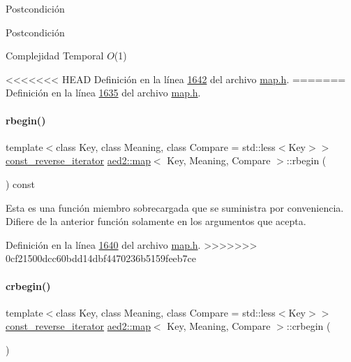 \begin{DoxyPostcond}{\-Postcondición}
\begin{DoxyPostcond}{\-Postcondición}
\begin{DoxyDescription}
\item[Complejidad Temporal]$O$(1)
\end{DoxyDescription}

<<<<<<< HEAD
\-Definición en la línea \hyperlink{map_8h_source_l01642}{1642} del archivo \hyperlink{map_8h_source}{map.\-h}.
=======
Definición en la línea \hyperlink{map_8h_source_l01635}{1635} del archivo \hyperlink{map_8h_source}{map.\+h}.

\mbox{\label{classaed2_1_1map_a71ab53ab04f5e35a189c6576fddeb483_a71ab53ab04f5e35a189c6576fddeb483}} 
\paragraph{\texorpdfstring{rbegin()}{rbegin()}\hspace{0.1cm}{\footnotesize\ttfamily [2/2]}}
{\footnotesize\ttfamily template$<$class Key, class Meaning, class Compare = std\+::less$<$\+Key$>$$>$ \\
\hyperlink{classaed2_1_1map_aed66a216549d13078a3ea6978ea0b768_aed66a216549d13078a3ea6978ea0b768}{const\+\_\+reverse\+\_\+iterator} \hyperlink{classaed2_1_1map}{aed2\+::map}$<$ Key, Meaning, Compare $>$\+::rbegin (\begin{DoxyParamCaption}{ }\end{DoxyParamCaption}) const\hspace{0.3cm}{\ttfamily [inline]}}

Esta es una función miembro sobrecargada que se suministra por conveniencia. Difiere de la anterior función solamente en los argumentos que acepta. 

Definición en la línea \hyperlink{map_8h_source_l01640}{1640} del archivo \hyperlink{map_8h_source}{map.\+h}.
>>>>>>> 0cf21500dcc60bdd14dbf4470236b5159feeb7ce

\mbox{\label{classaed2_1_1map_a6ad62765a2b2e00247b9e35a7542b448_a6ad62765a2b2e00247b9e35a7542b448}} 
\paragraph{\texorpdfstring{crbegin()}{crbegin()}}
{\footnotesize\ttfamily template$<$class Key, class Meaning, class Compare = std\+::less$<$\+Key$>$$>$ \\
\hyperlink{classaed2_1_1map_aed66a216549d13078a3ea6978ea0b768_aed66a216549d13078a3ea6978ea0b768}{const\+\_\+reverse\+\_\+iterator} \hyperlink{classaed2_1_1map}{aed2\+::map}$<$ Key, Meaning, Compare $>$\+::crbegin (\begin{DoxyParamCaption}{ }\end{DoxyParamCaption})\hspace{0.3cm}{\ttfamily [inline]}}


\end{DoxyPostcond}
\end{DoxyPostcond}

